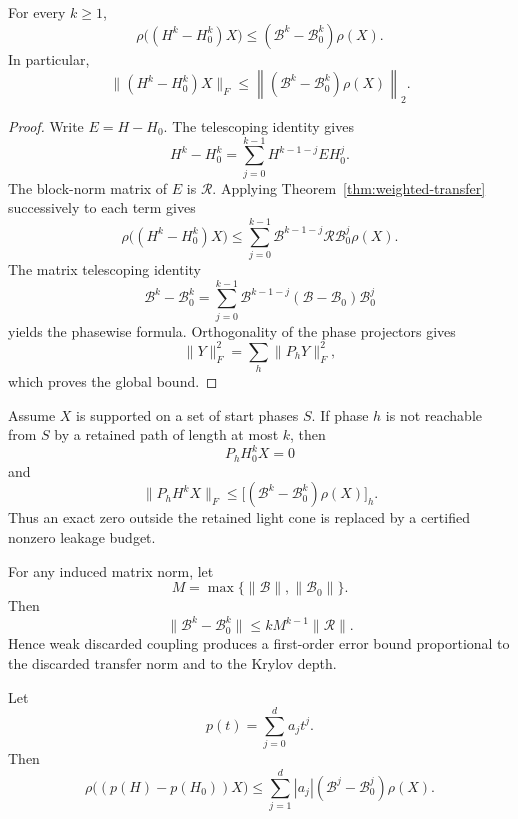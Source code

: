 \begin{theorem}
\label{thm:thresholded-power}
For every $k\geq1$,
\[
\boxed{
\rho\bigl((H^k-H_0^k)X\bigr)
\leq
(\mathcal B^k-\mathcal B_0^k)\rho(X).
}
\]
In particular,
\[
\boxed{
\lVert(H^k-H_0^k)X\rVert_F
\leq
\left\lVert(\mathcal B^k-\mathcal B_0^k)\rho(X)\right\rVert_2.
}
\]
\end{theorem}

\begin{proof}
Write $E=H-H_0$.  The telescoping identity gives
\[
H^k-H_0^k
=
\sum_{j=0}^{k-1}H^{k-1-j}EH_0^j.
\]
The block-norm matrix of $E$ is $\mathcal R$.  Applying
Theorem~\ref{thm:weighted-transfer} successively to each term gives
\[
\rho\bigl((H^k-H_0^k)X\bigr)
\leq
\sum_{j=0}^{k-1}
\mathcal B^{k-1-j}\mathcal R\mathcal B_0^j\rho(X).
\]
The matrix telescoping identity
\[
\mathcal B^k-\mathcal B_0^k
=
\sum_{j=0}^{k-1}
\mathcal B^{k-1-j}(\mathcal B-\mathcal B_0)\mathcal B_0^j
\]
yields the phasewise formula.  Orthogonality of the phase projectors gives
\[
\lVert Y\rVert_F^2=\sum_h\lVert P_hY\rVert_F^2,
\]
which proves the global bound.
\end{proof}

\begin{corollary}
\label{cor:approx-lightcone}
Assume $X$ is supported on a set of start phases $S$.  If phase $h$ is not
reachable from $S$ by a retained path of length at most $k$, then
\[
P_hH_0^kX=0
\]
and
\[
\boxed{
\lVert P_hH^kX\rVert_F
\leq
\bigl[(\mathcal B^k-\mathcal B_0^k)\rho(X)\bigr]_h.
}
\]
Thus an exact zero outside the retained light cone is replaced by a certified
nonzero leakage budget.
\end{corollary}

\begin{corollary}\label{claim:final-15-4}
For any induced matrix norm, let
\[
M=\max\{\lVert\mathcal B\rVert,\lVert\mathcal B_0\rVert\}.
\]
Then
\[
\boxed{
\lVert\mathcal B^k-\mathcal B_0^k\rVert
\leq
kM^{k-1}\lVert\mathcal R\rVert.
}
\]
Hence weak discarded coupling produces a first-order error bound proportional
to the discarded transfer norm and to the Krylov depth.
\end{corollary}

\begin{theorem}
\label{thm:polynomial-certificate}
Let
\[
p(t)=\sum_{j=0}^d a_jt^j.
\]
Then
\[
\boxed{
\rho\bigl((p(H)-p(H_0))X\bigr)
\leq
\sum_{j=1}^d
|a_j|(\mathcal B^j-\mathcal B_0^j)\rho(X).
}
\]
\end{theorem}


